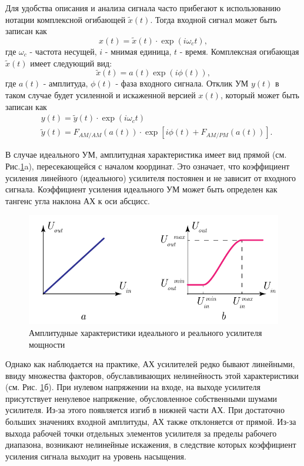 Для удобства описания и анализа сигнала часто прибегают к использованию
нотации комплексной огибающей $\tilde{x}(t)$. Тогда входной сигнал может быть
записан как 
\begin{equation}
    x(t) = \tilde{x}(t) \cdot \exp(i \omega_c t),
\end{equation}
где $\omega_c$ - частота несущей, $i$ - мнимая единица, $t$ - время.
Комплексная огибающая $\tilde{x}(t)$ имеет следующий вид:
\begin{equation}
    \tilde{x}(t) = a(t) \exp(i\phi(t)),
\end{equation}
где $a(t)$ - амплитуда, $\phi(t)$ - фаза входного сигнала. Отклик УМ $y(t)$
в таком случае будет усиленной и искаженной версией $x(t)$, который может
быть записан как
\begin{equation}
    \begin{aligned}
        &y(t) = \tilde{y}(t) \cdot \exp(i \omega_c t)\\
        &\tilde{y}(t) = F_{AM/AM}(a(t)) \cdot \exp[i \phi(t) + F_{AM/PM}(a(t))].
    \end{aligned}
\end{equation}

В случае идеального УМ, амплитудная характеристика имеет вид прямой (см.
Рис.\ref{fig:1.1}a), пересекающейся с началом координат. Это означает, что
коэффициент усиления линейного (идеального) усилителя постоянен и не
зависит от входного сигнала. Коэффициент усиления идеального УМ может быть
определен как тангенс угла наклона АХ к оси абсцисс.

\begin{figure}[h!]
    \centering
    \includegraphics[width=0.8\linewidth]{figs/amp_char.pdf}
    \caption{Амплитудные характеристики идеального и реального усилителя мощности}
    \label{fig:1.1}
\end{figure}

Однако как наблюдается на практике, АХ усилителей редко бывают линейными,
ввиду множества факторов, обуславливающих нелинейность этой характеристики
(см. Рис. \ref{fig:1.1}б). При нулевом напряжении на входе, на выходе
усилителя присутствует ненулевое напряжение, обусловленное собственными
шумами усилителя. Из-за этого появляется изгиб в нижней части АХ. При
достаточно больших значениях входной амплитуды, АХ также отклоняется от
прямой. Из-за выхода рабочей точки отдельных элементов усилителя за пределы
рабочего диапазона, возникают нелинейные искажения, в следствие которых
коэффициент усиления сигнала выходит на уровень насыщения.

